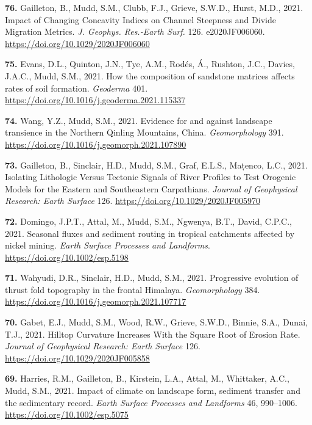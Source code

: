 \documentclass[10pt, a4paper]{article}
\newcommand{\years}[1]{\marginnote{\scriptsize #1}}
\begin{document}
\years{2021}\hangindent=0.7cm\textbf{76. }Gailleton, B., Mudd, S.M., Clubb, F.J., Grieve, S.W.D., Hurst, M.D., 2021. Impact of Changing Concavity Indices on Channel Steepness and Divide Migration Metrics. \textit{J. Geophys. Res.-Earth Surf.} 126. e2020JF006060. \href{https://doi.org/10.1029/2020JF006060}{https://doi.org/10.1029/2020JF006060}\par
\years{2021}\hangindent=0.7cm\textbf{75. }Evans, D.L., Quinton, J.N., Tye, A.M., Rodés, Á., Rushton, J.C., Davies, J.A.C., Mudd, S.M., 2021. How the composition of sandstone matrices affects rates of soil formation. \textit{Geoderma} 401. \href{https://doi.org/10.1016/j.geoderma.2021.115337}{https://doi.org/10.1016/j.geoderma.2021.115337}\par
\years{2021}\hangindent=0.7cm\textbf{74. }Wang, Y.Z., Mudd, S.M., 2021. Evidence for and against landscape transience in the Northern Qinling Mountains, China. \textit{Geomorphology} 391. \href{https://doi.org/10.1016/j.geomorph.2021.107890}{https://doi.org/10.1016/j.geomorph.2021.107890}\par
\years{2021}\hangindent=0.7cm\textbf{73. }Gailleton, B., Sinclair, H.D., Mudd, S.M., Graf, E.L.S., Mațenco, L.C., 2021. Isolating Lithologic Versus Tectonic Signals of River Profiles to Test Orogenic Models for the Eastern and Southeastern Carpathians. \textit{Journal of Geophysical Research: Earth Surface} 126. \href{https://doi.org/10.1029/2020JF005970}{https://doi.org/10.1029/2020JF005970}\par
\years{2021}\hangindent=0.7cm\textbf{72. }Domingo, J.P.T., Attal, M., Mudd, S.M., Ngwenya, B.T., David, C.P.C., 2021. Seasonal fluxes and sediment routing in tropical catchments affected by nickel mining. \textit{Earth Surface Processes and Landforms}. \href{https://doi.org/10.1002/esp.5198}{https://doi.org/10.1002/esp.5198}\par
\years{2021}\hangindent=0.7cm\textbf{71. }Wahyudi, D.R., Sinclair, H.D., Mudd, S.M., 2021. Progressive evolution of thrust fold topography in the frontal Himalaya. \textit{Geomorphology} 384. \href{https://doi.org/10.1016/j.geomorph.2021.107717}{https://doi.org/10.1016/j.geomorph.2021.107717}\par
\years{2021}\hangindent=0.7cm\textbf{70. }Gabet, E.J., Mudd, S.M., Wood, R.W., Grieve, S.W.D., Binnie, S.A., Dunai, T.J., 2021. Hilltop Curvature Increases With the Square Root of Erosion Rate. \textit{Journal of Geophysical Research: Earth Surface} 126. \href{https://doi.org/10.1029/2020JF005858}{https://doi.org/10.1029/2020JF005858}\par
\years{2021}\hangindent=0.7cm\textbf{69. }Harries, R.M., Gailleton, B., Kirstein, L.A., Attal, M., Whittaker, A.C., Mudd, S.M., 2021. Impact of climate on landscape form, sediment transfer and the sedimentary record. \textit{Earth Surface Processes and Landforms} 46, 990–1006. \href{https://doi.org/10.1002/esp.5075}{https://doi.org/10.1002/esp.5075}\par
\end{document}
